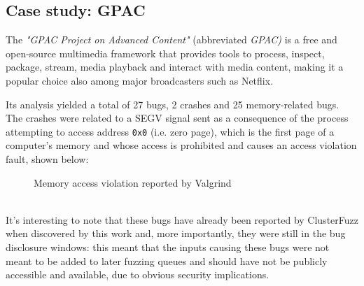 \subsection{Case study: GPAC}
The \textit{"GPAC Project on Advanced Content"} (abbreviated \textit{GPAC)} \cite{gpac} is a free and open-source multimedia framework that provides tools to process, inspect, package, stream, media playback and interact with media content, making it a popular choice also among major broadcasters such as Netflix.

Its analysis yielded a total of 27 bugs, 2 crashes and 25 memory-related bugs.
The crashes were related to a SEGV signal sent as a consequence of the process attempting to access address \verb|0x0| (i.e. zero page), which is the first page of a computer's memory and whose access is prohibited and causes an access violation fault, shown below:
\begin{figure}[h]
\caption{Memory access violation reported by Valgrind }
\label{fig:segv_gpac}
\end{figure}
\ \\
It's interesting to note that these bugs have already been reported by ClusterFuzz when discovered by this work and, more importantly, they were still in the bug disclosure windows: this meant that the inputs causing these bugs were not meant to be added to later fuzzing queues and should have not be publicly accessible and available, due to obvious security implications.

